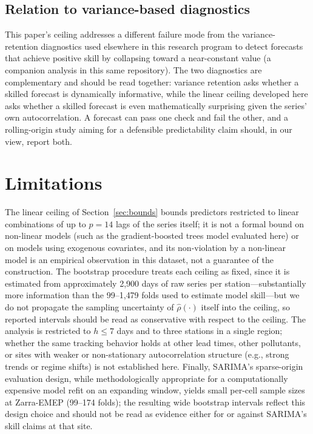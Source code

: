 \documentclass{article}
\begin{document}
\subsection{Relation to variance-based diagnostics}

This paper's ceiling addresses a different failure mode from the variance-
retention diagnostics used elsewhere in this research program to detect
forecasts that achieve positive skill by collapsing toward a near-constant
value (a companion analysis in this same repository). The two diagnostics are
complementary and should be read together: variance retention asks whether a
skilled forecast is dynamically informative, while the linear ceiling
developed here asks whether a skilled forecast is even mathematically
surprising given the series' own autocorrelation. A forecast can pass one
check and fail the other, and a rolling-origin study aiming for a defensible
predictability claim should, in our view, report both.

\section{Limitations}

The linear ceiling of Section~\ref{sec:bounds} bounds predictors restricted to
linear combinations of up to $p=14$ lags of the series itself; it is not a
formal bound on non-linear models (such as the gradient-boosted trees model
evaluated here) or on models using exogenous covariates, and its non-violation
by a non-linear model is an empirical observation in this dataset, not a
guarantee of the construction.
The bootstrap procedure treats each ceiling as fixed, since it is estimated
from approximately 2{,}900 days of raw series per station---substantially more
information than the 99--1{,}479 folds used to estimate model skill---but we
do not propagate the sampling uncertainty of $\hat\rho(\cdot)$ itself into the
ceiling, so reported intervals should be read as conservative with respect to
the ceiling.
The analysis is restricted to $h\le7$ days and to three stations in a single
region; whether the same tracking behavior holds at other lead times, other
pollutants, or sites with weaker or non-stationary autocorrelation structure
(e.g., strong trends or regime shifts) is not established here.
Finally, SARIMA's sparse-origin evaluation design, while methodologically
appropriate for a computationally expensive model refit on an expanding
window, yields small per-cell sample sizes at Zarra-EMEP (99--174 folds); the
resulting wide bootstrap intervals reflect this design choice and should not
be read as evidence either for or against SARIMA's skill claims at that site.
\end{document}
